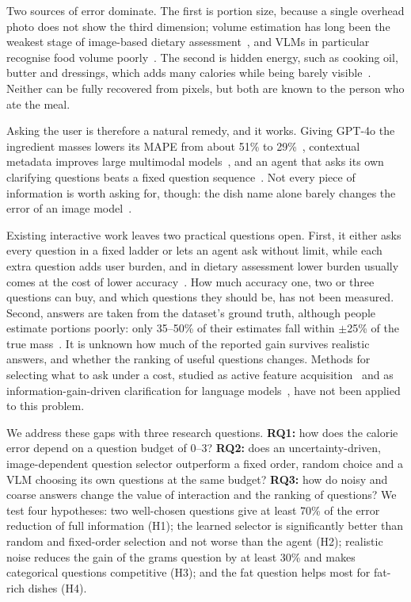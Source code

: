 \documentclass[twocolumn]{svjour3}
\begin{document}
Two sources of error dominate. The first is portion size, because a single overhead photo does not show
the third dimension; volume estimation has long been the weakest stage of image-based dietary
assessment~\cite{lo2020review,vinod2026portion}, and VLMs in particular recognise food volume
poorly~\cite{tanabe2025calorievol}. The second is hidden energy, such as cooking oil, butter and dressings,
which adds many calories while being barely visible~\cite{bhatambarekar2025thesis}. Neither can be fully
recovered from pixels, but both are known to the person who ate the meal.

Asking the user is therefore a natural remedy, and it works. Giving GPT-4o the ingredient masses lowers
its MAPE from about 51\% to 29\%~\cite{bhatambarekar2025thesis}, contextual metadata improves large
multimodal models~\cite{coburn2025lmm}, and an agent that asks its own clarifying questions beats a fixed
question sequence~\cite{bhatambarekar2026agentic}. Not every piece of information is worth asking for,
though: the dish name alone barely changes the error of an image model~\cite{narang2025multimodal}.

Existing interactive work leaves two practical questions open. First, it either asks every question in
a fixed ladder or lets an agent ask without limit, while each extra question adds user burden, and in
dietary assessment lower burden usually comes at the cost of lower accuracy~\cite{hochsmann2020review}. How much accuracy one, two or three questions can buy, and which
questions they should be, has not been measured. Second, answers are taken from the dataset's ground
truth, although people estimate portions poorly: only 35--50\% of their estimates fall within $\pm$25\% of
the true mass~\cite{lucassen2021portion}. It is unknown how much of the reported gain survives realistic
answers, and whether the ranking of useful questions changes. Methods for selecting what to ask under a
cost, studied as active feature acquisition~\cite{aronsson2025afa} and as information-gain-driven
clarification for language models~\cite{kobalczyk2025active,infogain2026clarification}, have not been
applied to this problem.

We address these gaps with three research questions. \textbf{RQ1:} how does the calorie error depend on a
question budget of 0--3? \textbf{RQ2:} does an uncertainty-driven, image-dependent question selector
outperform a fixed order, random choice and a VLM choosing its own questions at the same budget?
\textbf{RQ3:} how do noisy and coarse answers change the value of interaction and the ranking of
questions? We test four hypotheses: two well-chosen questions give at least 70\% of the error reduction of
full information (H1); the learned selector is significantly better than random and fixed-order selection
and not worse than the agent (H2); realistic noise reduces the gain of the grams question by at least 30\%
and makes categorical questions competitive (H3); and the fat question helps most for fat-rich dishes (H4).
\end{document}

